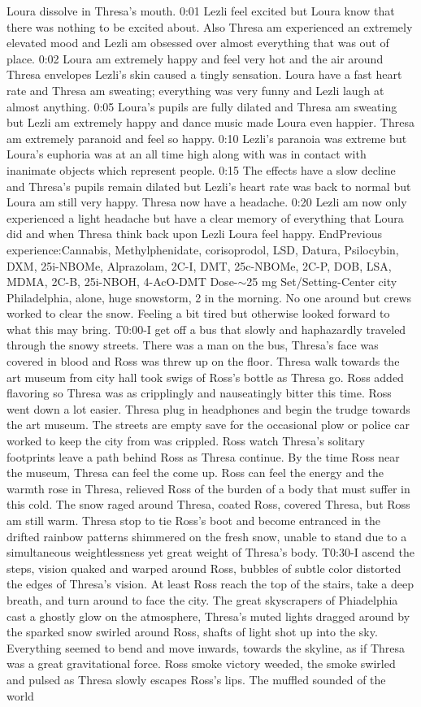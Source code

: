\documentclass[12pt]{book}
\begin{document}
Loura dissolve in Thresa's mouth. 0:01 Lezli feel excited but Loura know that there was nothing to be excited about. Also Thresa am experienced an extremely elevated mood and Lezli am obsessed over almost everything that was out of place. 0:02 Loura am extremely happy and feel very hot and the air around Thresa envelopes Lezli's skin caused a tingly sensation. Loura have a fast heart rate and Thresa am sweating; everything was very funny and Lezli laugh at almost anything. 0:05 Loura's pupils are fully dilated and Thresa am sweating but Lezli am extremely happy and dance music made Loura even happier. Thresa am extremely paranoid and feel so happy. 0:10 Lezli's paranoia was extreme but Loura's euphoria was at an all time high along with was in contact with inanimate objects which represent people. 0:15 The effects have a slow decline and Thresa's pupils remain dilated but Lezli's heart rate was back to normal but Loura am still very happy. Thresa now have a headache. 0:20 Lezli am now only experienced a light headache but have a clear memory of everything that Loura did and when Thresa think back upon Lezli Loura feel happy. EndPrevious experience:Cannabis, Methylphenidate, corisoprodol, LSD, Datura, Psilocybin, DXM, 25i-NBOMe, Alprazolam, 2C-I, DMT, 25c-NBOMe, 2C-P, DOB, LSA, MDMA, 2C-B, 25i-NBOH, 4-AcO-DMT Dose-$\sim$25 mg Set/Setting-Center city Philadelphia, alone, huge snowstorm, 2 in the morning. No one around but crews worked to clear the snow. Feeling a bit tired but otherwise looked forward to what this may bring. T0:00-I get off a bus that slowly and haphazardly traveled through the snowy streets. There was a man on the bus, Thresa's face was covered in blood and Ross was threw up on the floor. Thresa walk towards the art museum from city hall took swigs of Ross's bottle as Thresa go. Ross added flavoring so Thresa was as cripplingly and nauseatingly bitter this time. Ross went down a lot easier. Thresa plug in headphones and begin the trudge towards the art museum. The streets are empty save for the occasional plow or police car worked to keep the city from was crippled. Ross watch Thresa's solitary footprints leave a path behind Ross as Thresa continue. By the time Ross near the museum, Thresa can feel the come up. Ross can feel the energy and the warmth rose in Thresa, relieved Ross of the burden of a body that must suffer in this cold. The snow raged around Thresa, coated Ross, covered Thresa, but Ross am still warm. Thresa stop to tie Ross's boot and become entranced in the drifted rainbow patterns shimmered on the fresh snow, unable to stand due to a simultaneous weightlessness yet great weight of Thresa's body. T0:30-I ascend the steps, vision quaked and warped around Ross, bubbles of subtle color distorted the edges of Thresa's vision. At least Ross reach the top of the stairs, take a deep breath, and turn around to face the city. The great skyscrapers of Phiadelphia cast a ghostly glow on the atmosphere, Thresa's muted lights dragged around by the sparked snow swirled around Ross, shafts of light shot up into the sky. Everything seemed to bend and move inwards, towards the skyline, as if Thresa was a great gravitational force. Ross smoke victory weeded, the smoke swirled and pulsed as Thresa slowly escapes Ross's lips. The muffled sounded of the world 
\end{document}
